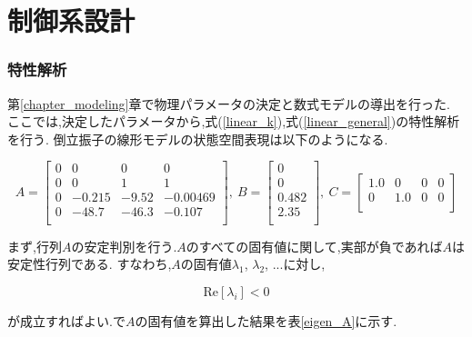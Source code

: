 \chapter{制御系設計}
\subsection{特性解析}
第\ref{chapter_modeling}章で物理パラメータの決定と数式モデルの導出を行った.
ここでは,決定したパラメータから,式(\ref{linear_k}),式(\ref{linear_general})の特性解析を行う.
倒立振子の線形モデルの状態空間表現は以下のようになる.

\begin{equation}
    A = 
    \left[
        \begin{array}{cccc}
            0  &  0      &  0      &  0         \\
            0  &  0      &  1      &  1         \\
            0  & -0.215  &  -9.52  &  -0.00469  \\
            0  &  -48.7  &  -46.3  &  -0.107    \\
        \end{array}
    \right]
    \label{ABC}
    ,\
    B = 
    \left[
        \begin{array}{c}
            0      \\
            0      \\
            0.482  \\
            2.35   \\
        \end{array}
    \right]
    ,\
    C = 
    \left[
        \begin{array}{cccc}
            1.0  &  0    &  0  &  0  \\
            0    &  1.0  &  0  &  0  \\
        \end{array}
    \right]
\end{equation}

まず,行列$A$の安定判別を行う.$A$のすべての固有値に関して,実部が負であれば$A$は安定性行列である.
すなわち,$A$の固有値$\lambda_{1}$, $\lambda_{2}$, $...$に対し,

$$
    \mbox{Re}[\lambda_{i}] < 0
$$

が成立すればよい.\MaTX{}で$A$の固有値を算出した結果を表\ref{eigen_A}に示す.


